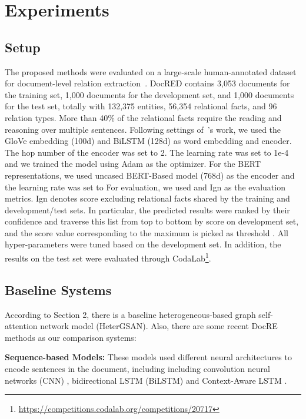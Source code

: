 \documentclass[letterpaper]{article} \usepackage{aaai21}  \usepackage{times}  \usepackage{helvet} \usepackage{courier}  \usepackage[hyphens]{url}  \usepackage{graphicx} \urlstyle{rm} \def\UrlFont{\rm}  \usepackage{natbib}  \usepackage{caption} \frenchspacing  \setlength{\pdfpagewidth}{8.5in}  \setlength{\pdfpageheight}{11in}  \usepackage{amsmath}
\begin{document}
\section{Experiments}
\subsection{Setup}
The proposed methods were evaluated on a large-scale human-annotated dataset for document-level relation extraction~\cite{yao-etal-2019-docred}. 
DocRED contains 3,053 documents for the training set, 1,000 documents for the development set, and 1,000 documents for the test set, totally with 132,375 entities, 56,354 relational facts, and 96 relation types. 
More than 40\% of the relational facts require the reading and reasoning over multiple sentences.
Following settings of~\cite{Nan2020ReasoningWL}'s work, we used the GloVe embedding (100d) and BiLSTM (128d) as word embedding and encoder.
The hop number  of the encoder was set to 2. 
The learning rate was set to 1e-4 and we trained the model using Adam as the optimizer.
For the BERT representations, we used uncased BERT-Based model (768d) as the encoder and the learning rate was set to 
For evaluation, we used  and Ign  as the evaluation metrics. 
Ign  denotes  score excluding relational facts shared by the training and development/test sets.
In particular, the predicted results were ranked by their confidence and traverse this list from top to bottom by  score on development set, and the score value corresponding to the maximum  is picked as threshold .
All hyper-parameters were tuned based on the development set.
In addition, the results on the test set were evaluated through CodaLab\footnote{\url{https://competitions.codalab.org/competitions/20717}}.


\subsection{Baseline Systems}
According to Section 2, there is a baseline heterogeneous-based graph self-attention network model (HeterGSAN).
Also, there are some recent DocRE methods as our comparison systems:

  \textbf{Sequence-based Models:} 
These models used different neural architectures to encode sentences in the document, including including convolution neural networks (CNN) \cite{yao-etal-2019-docred}, bidirectional LSTM (BiLSTM) \cite{yao-etal-2019-docred} and Context-Aware LSTM \cite{yao-etal-2019-docred}.
\end{document}
